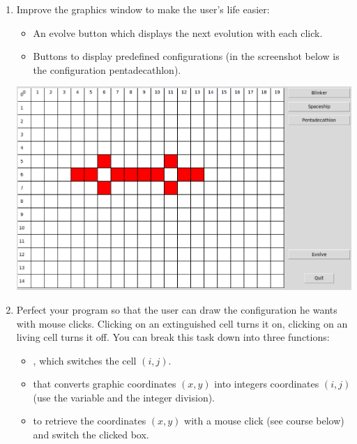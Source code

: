 \documentclass[11pt,class=report,crop=false]{standalone}
\begin{document}
 


\begin{activite}[Iterations]


\begin{enumerate}
  \item Improve the graphics window to make the user's life easier:
  \begin{itemize}
    \item An \og{}evolve\fg{} button which displays the next evolution with each click.
    \item Buttons to display predefined configurations (in the screenshot below is the configuration \og{}pentadecathlon\fg{}).
  \end{itemize}
  
\begin{center}
\includegraphics[scale=\myscale,scale=0.3]{screen-life-4a-en}
\end{center}  
  
  \item Perfect your program so that the user can draw the configuration he wants with mouse clicks. Clicking on an extinguished cell turns it on, clicking on an living cell turns it off. 
  You can break this task down into three functions:
  \begin{itemize}
    \item {}, which switches the cell $(i,j)$.
    \item {} that converts graphic coordinates $(x,y)$ into integers coordinates $(i,j)$ (use the   variable and the integer division).
    \item {} to retrieve the coordinates $(x,y)$ with a mouse click (see course below) and switch the clicked box.
  \end{itemize}   
    

\end{enumerate}
\end{activite}
\end{document}
